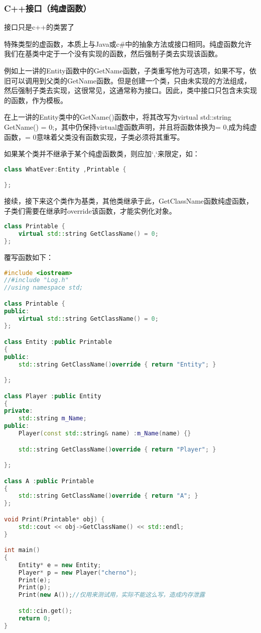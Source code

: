 \subsubsection{C++接口（纯虚函数）}

接口只是c++的类罢了

特殊类型的虚函数，本质上与Java或c\#中的抽象方法或接口相同。纯虚函数允许我们在基类中定于一个没有实现的函数，然后强制子类去实现该函数。

例如上一讲的{\ncodestyle Entity}函数中的{\ncodestyle GetName}函数，子类重写他为可选项，如果不写，依旧可以调用到父类的{\ncodestyle GetName}函数。但是创建一个类，只由未实现的方法组成，然后强制子类去实现，这很常见，这通常称为接口。因此，类中接口只包含未实现的函数，作为模板。

在上一讲的Entity类中的GetName()函数中，将其改写为{\ncodestyle virtual std::string GetName() = 0;}，其中仍保持{\ncodestyle virtual}虚函数声明，并且将函数体换为{\ncodestyle = 0},成为纯虚函数，{\ncodestyle = 0}意味着父类没有函数实现，子类必须将其重写。

如果某个类并不继承于某个纯虚函数类，则应加`,`来限定，如：

\begin{lstlisting}[language=c++]
class WhatEver:Entity ,Printable {

};
\end{lstlisting}


接续，接下来这个类作为基类，其他类继承于此，{\ncodestyle GetClassName}函数纯虚函数，子类们需要在继承时{\ncodestyle override}该函数，才能实例化对象。

\begin{lstlisting}[language=c++]
class Printable {
    virtual std::string GetClassName() = 0; 
};
\end{lstlisting}

覆写函数如下：

\begin{lstlisting}[language=c++]
#include <iostream>
//#include "Log.h"
//using namespace std;

class Printable {
public:
    virtual std::string GetClassName() = 0;
};

class Entity :public Printable
{
public:
    std::string GetClassName()override { return "Entity"; }

};

class Player :public Entity
{
private:
    std::string m_Name;
public:
    Player(const std::string& name) :m_Name(name) {}

    std::string GetClassName()override { return "Player"; }

};

class A :public Printable
{
    std::string GetClassName()override { return "A"; }
};

void Print(Printable* obj) {
    std::cout << obj->GetClassName() << std::endl;
}

int main()
{
    Entity* e = new Entity;
    Player* p = new Player("cherno");
    Print(e);
    Print(p);
    Print(new A());//仅用来测试用，实际不能这么写，造成内存泄露

    std::cin.get();
    return 0;
}
\end{lstlisting}


